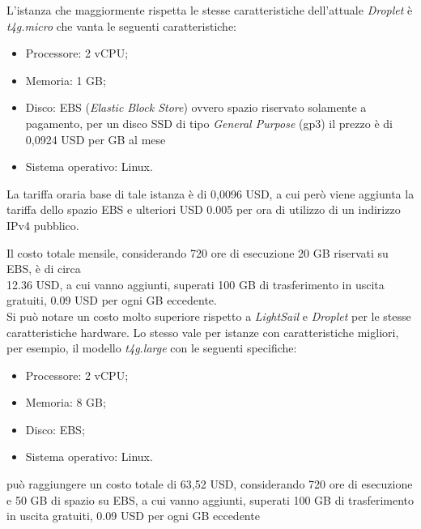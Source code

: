 \documentclass[10pt, letterpaper]{article}
\begin{document}
L'istanza che maggiormente rispetta le stesse caratteristiche dell'attuale \textit{Droplet} è \textit{t4g.micro} che vanta le seguenti caratteristiche: 
\begin{itemize}
    \item Processore: 2 vCPU; 
    \item Memoria: 1 GB;
    \item Disco: EBS (\textit{Elastic Block Store}) ovvero spazio riservato solamente a pagamento, per un disco SSD di tipo \textit{General Purpose} (gp3) il prezzo è di 0,0924 USD per GB al mese
    \item Sistema operativo: Linux.
\end{itemize}

La tariffa oraria base di tale istanza è di 0,0096 USD, a cui però viene aggiunta la tariffa dello spazio EBS e ulteriori USD 0.005 per ora di utilizzo di un indirizzo IPv4 pubblico.

Il costo totale mensile, considerando 720 ore di esecuzione 20 GB riservati su EBS, è di circa \\12.36 USD, a cui vanno aggiunti, superati 100 GB di trasferimento in uscita gratuiti, 0.09 USD per ogni GB eccedente.\\

Si può notare un costo molto superiore rispetto a \textit{LightSail} e \textit{Droplet} per le stesse caratteristiche hardware.
Lo stesso vale per istanze con caratteristiche migliori, per esempio, il modello \textit{t4g.large} con le seguenti specifiche:  
\begin{itemize}
    \item Processore: 2 vCPU; 
    \item Memoria: 8 GB;
    \item Disco: EBS;
    \item Sistema operativo: Linux.
\end{itemize}

può raggiungere un costo totale di 63,52 USD, considerando 720 ore di esecuzione e 50 GB di spazio su EBS, a cui vanno aggiunti, superati 100 GB di trasferimento in uscita gratuiti, 0.09 USD per ogni GB eccedente
\end{document}
